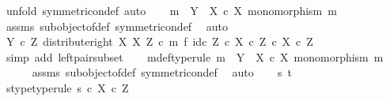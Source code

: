 \begin{isabellebody}
%
\isadelimproof
%
\endisadelimproof
%
\isatagproof
{}\isamarkupfalse%
\ {\isacharparenleft}{\kern0pt}unfold\ symmetric{\isacharunderscore}{\kern0pt}on{\isacharunderscore}{\kern0pt}def{\isacharcomma}{\kern0pt}\ auto{\isacharparenright}{\kern0pt}\isanewline
\ \ \isamarkupfalse%
\ {\isachardoublequoteopen}m\ {\isacharcolon}{\kern0pt}\ Y\ {\isasymrightarrow}\ X\ {\isasymtimes}\isactrlsub c\ X{\isachardoublequoteclose}\ {\isachardoublequoteopen}monomorphism\ m{\isachardoublequoteclose}\isanewline
\ \ \ \ \isamarkupfalse%
\ assms\ subobject{\isacharunderscore}{\kern0pt}of{\isacharunderscore}{\kern0pt}def{}\ symmetric{\isacharunderscore}{\kern0pt}on{\isacharunderscore}{\kern0pt}def\ \isamarkupfalse%
\ auto\isanewline
\ \ \isamarkupfalse%
\ \isamarkupfalse%
\ {\isachardoublequoteopen}{\isacharparenleft}{\kern0pt}Y\ {\isasymtimes}\isactrlsub c\ Z{\isacharcomma}{\kern0pt}\ distribute{\isacharunderscore}{\kern0pt}right\ X\ X\ Z\ {\isasymcirc}\isactrlsub c\ m\ {\isasymtimes}\isactrlsub f\ id\isactrlsub c\ Z{\isacharparenright}{\kern0pt}\ {\isasymsubseteq}\isactrlsub c\ {\isacharparenleft}{\kern0pt}X\ {\isasymtimes}\isactrlsub c\ Z{\isacharparenright}{\kern0pt}\ {\isasymtimes}\isactrlsub c\ X\ {\isasymtimes}\isactrlsub c\ Z{\isachardoublequoteclose}\isanewline
\ \ \ \ \isamarkupfalse%
\ {\isacharparenleft}{\kern0pt}simp\ add{\isacharcolon}{\kern0pt}\ left{\isacharunderscore}{\kern0pt}pair{\isacharunderscore}{\kern0pt}subset{\isacharparenright}{\kern0pt}\isanewline
{}\isamarkupfalse%
\isanewline
\ \ \isamarkupfalse%
\ m{\isacharunderscore}{\kern0pt}def{\isacharbrackleft}{\kern0pt}type{\isacharunderscore}{\kern0pt}rule{\isacharbrackright}{\kern0pt}{\isacharcolon}{\kern0pt}\ {\isachardoublequoteopen}m\ {\isacharcolon}{\kern0pt}\ Y\ {\isasymrightarrow}\ X\ {\isasymtimes}\isactrlsub c\ X{\isachardoublequoteclose}\ {\isachardoublequoteopen}monomorphism\ m{\isachardoublequoteclose}\isanewline
\ \ \ \ \isamarkupfalse%
\ assms\ subobject{\isacharunderscore}{\kern0pt}of{\isacharunderscore}{\kern0pt}def{}\ symmetric{\isacharunderscore}{\kern0pt}on{\isacharunderscore}{\kern0pt}def\ \isamarkupfalse%
\ auto\isanewline
\ \ \isamarkupfalse%
\ s\ t\ \isanewline
\ \ \isamarkupfalse%
\ s{\isacharunderscore}{\kern0pt}type{\isacharbrackleft}{\kern0pt}type{\isacharunderscore}{\kern0pt}rule{\isacharbrackright}{\kern0pt}{\isacharcolon}{\kern0pt}\ {\isachardoublequoteopen}s\ {\isasymin}\isactrlsub c\ X\ {\isasymtimes}\isactrlsub c\ Z{\isachardoublequoteclose}\isanewline

\end{isabellebody}
